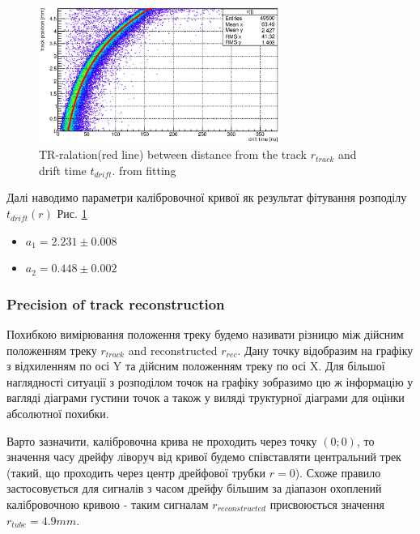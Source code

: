 \documentclass[]{article}
\begin{document}
	\begin{figure}[h]
	\includegraphics[width=0.7\textwidth]{rt_calibration.eps}
	\centering
	\caption{ TR-ralation(red line) between distance from the track $r_{track}$ and drift time $t_{drift}$.  from fitting }
	\label{fig:calibration_00}
	\end{figure}
	
	Далі наводимо параметри калібровочної кривої як результат фітування розподілу $t_{drift}(r)$ Рис. \ref{fig:calibration_00} 
	
	\begin{itemize}
		\item $a_1 = 2.231 \pm 0.008$
		\item $a_2 = 0.448 \pm 0.002$
	\end{itemize}
	
	\subsubsection{Precision of track reconstruction}
	Похибкою вимірювання положення треку будемо називати різницю між дійсним положенням треку $r_{track}$ and reconstructed $r_{rec}$. Дану точку відобразим на графіку з відхиленням по осі Y та дійсним положенням треку по осі X. Для більшої наглядності ситуації з розподілом точок на графіку зобразимо цю ж інформацію у вагляді діаграми густини точок а також у виляді труктурної діаграми для  оцінки абсолютної похибки.
	
	Варто зазначити, калібровочна крива не проходить через точку $(0;0)$, то значення часу дрейфу ліворуч від кривої будемо співставляти центральний трек (такий, що проходить через центр дрейфової трубки $r=0$). Схоже правило застосовується для сигналів з часом дрейфу більшим за діапазон охоплений калібровочною кривою - таким сигналам $r_{reconstructed}$ присвоюється значення $r_{tube} = 4.9mm$.
	
\end{document}
